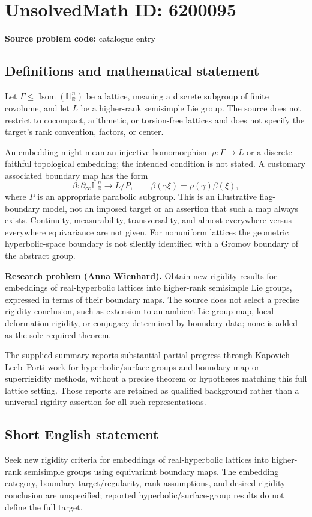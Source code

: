 \documentclass[11pt]{article}
\newcommand{\R}{\mathbb{R}}
\begin{document}
\section*{UnsolvedMath ID: 6200095}
\textbf{Source problem code:} catalogue entry
\subsection{Definitions and mathematical statement}
Let $\Gamma\leq\operatorname{Isom}(\mathbb H^n_{\R})$ be a lattice, meaning a discrete subgroup of finite covolume, and let $L$ be a higher-rank semisimple Lie group. The source does not restrict to cocompact, arithmetic, or torsion-free lattices and does not specify the target's rank convention, factors, or center.

An embedding might mean an injective homomorphism $\rho:\Gamma\to L$ or a discrete faithful topological embedding; the intended condition is not stated. A customary associated boundary map has the form
\[
 \beta:\partial_\infty\mathbb H^n_{\R}\longrightarrow L/P,
 \qquad \beta(\gamma\xi)=\rho(\gamma)\beta(\xi),
\]
where $P$ is an appropriate parabolic subgroup. This is an illustrative flag-boundary model, not an imposed target or an assertion that such a map always exists. Continuity, measurability, transversality, and almost-everywhere versus everywhere equivariance are not given. For nonuniform lattices the geometric hyperbolic-space boundary is not silently identified with a Gromov boundary of the abstract group.

\textbf{Research problem (Anna Wienhard).} Obtain new rigidity results for embeddings of real-hyperbolic lattices into higher-rank semisimple Lie groups, expressed in terms of their boundary maps. The source does not select a precise rigidity conclusion, such as extension to an ambient Lie-group map, local deformation rigidity, or conjugacy determined by boundary data; none is added as the sole required theorem.

The supplied summary reports substantial partial progress through Kapovich--Leeb--Porti work for hyperbolic/surface groups and boundary-map or superrigidity methods, without a precise theorem or hypotheses matching this full lattice setting. Those reports are retained as qualified background rather than a universal rigidity assertion for all such representations.
\subsection{Short English statement}
Seek new rigidity criteria for embeddings of real-hyperbolic lattices into higher-rank semisimple groups using equivariant boundary maps. The embedding category, boundary target/regularity, rank assumptions, and desired rigidity conclusion are unspecified; reported hyperbolic/surface-group results do not define the full target.
\end{document}
